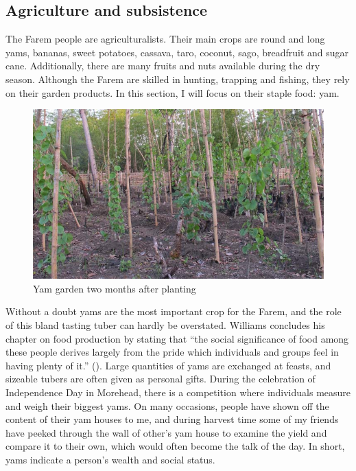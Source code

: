 \subsection{Agriculture and subsistence}\label{agriculture}

The Farem people are agriculturalists. Their main crops are round and long yams, bananas, sweet potatoes, cassava, taro, coconut, sago, breadfruit and sugar cane. Additionally, there are many fruits and nuts available during the dry season. Although the Farem are skilled in hunting, trapping and fishing, they rely on their garden products. In this section, I will focus on their staple food: yam.

\begin{figure}
    \includegraphics[width=.9\textwidth]{figures/yam1.jpg}
  \caption[Yam garden two months after planting]{Yam garden two months after planting}
  \label{fig:yam1}
\end{figure}%

Without a doubt yams are the most important crop for the Farem, and the role of this bland tasting tuber can hardly be overstated. Williams concludes his chapter on food production by stating that ``the social significance of food among these people derives largely from the pride which individuals and groups feel in having plenty of it.'' (\citeyear[235]{Williams:1936transfly}). Large quantities of yams are exchanged at feasts, and sizeable tubers are often given as personal gifts. During the celebration of Independence Day in Morehead, there is a competition where individuals measure and weigh their biggest yams. On many occasions, people have shown off the content of their yam houses to me, and during harvest time some of my friends have peeked through the wall of other's yam house to examine the yield and compare it to their own, which would often become the talk of the day. In short, yams indicate a person's wealth and social status.


